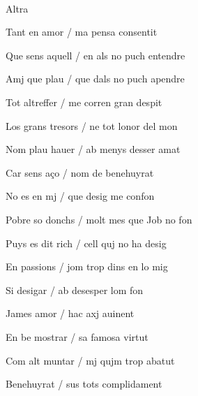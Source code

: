 \documentclass[12pt]{article}
\renewcommand{\espaiAbansEtiquetaPoema}{\vspace{0ex}}
\begin{document}
\begin{estrofa}

\espaiAbansEtiquetaPoema

\\

\begin{rubrica}

\pagina{[145v]} Altra

\end{rubrica}

\end{estrofa}


\begin{estrofa}

 Tant en amor / ma pensa consentit

 Que sens aquell / en als no puch entendre

 Amj que plau / que dals no puch apendre

 Tot altreffer / me corren gran despit

 Los grans tresors / ne tot lonor del mon

 Nom plau hauer / ab menys desser amat

 Car sens a\c{c}o / nom de benehuyrat

 No es en mj / que desig me confon

\end{estrofa}



\begin{estrofa}

 Pobre so donchs / molt mes que Job no fon

 Puys es dit rich / cell quj no ha desig

 En passions / jom trop dins en lo mig

 Si desigar / ab desesper lom fon

 James amor / hac axj auinent

 En be mostrar / sa famosa virtut

 Com alt muntar / mj qujm trop abatut

 Benehuyrat / sus tots complidament

\end{estrofa}
\end{document}
